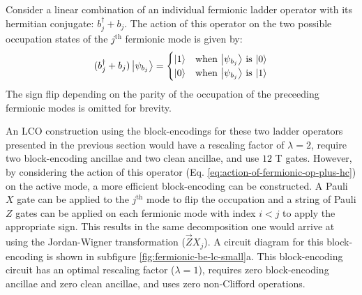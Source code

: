 Consider a linear combination of an individual fermionic ladder operator with its hermitian conjugate: $b_j^\dagger + b_j$.
The action of this operator on the two possible occupation states of the $j^\text{th}$ fermionic mode is given by:
\begin{equation}
    \label{eq:action-of-fermionic-op-plus-hc}
    \begin{split}
        (b_j^\dagger + b_j) \ket{\psi_{b_j}} = \begin{cases} 
            \ket{1} & \text{when $\ket{\psi_{b_j}}$ is $\ket{0}$} \\
            \ket{0} & \text{when $\ket{\psi_{b_j}}$ is $\ket{1}$} \\
                                        \end{cases}
    \end{split}
\end{equation}
The sign flip depending on the parity of the occupation of the preceeding fermionic modes is omitted for brevity.

An LCO construction using the block-encodings for these two ladder operators presented in the previous section would have a rescaling factor of $\lambda = 2$, require two block-encoding ancillae and two clean ancillae, and use $12$ T gates.
However, by considering the action of this operator (Eq. \ref{eq:action-of-fermionic-op-plus-hc}) on the active mode, a more efficient block-encoding can be constructed.
A Pauli $X$ gate can be applied to the $j^\text{th}$ mode to flip the occupation and a string of Pauli $Z$ gates can be applied on each fermionic mode with index $i < j$ to apply the appropriate sign.
This results in the same decomposition one would arrive at using the Jordan-Wigner transformation ($\vec{Z}X_j$).
A circuit diagram for this block-encoding is shown in subfigure \ref{fig:fermionic-be-lc-small}a.
This block-encoding circuit has an optimal rescaling factor ($\lambda = 1$), requires zero block-encoding ancillae and zero clean ancillae, and uses zero non-Clifford operations.

